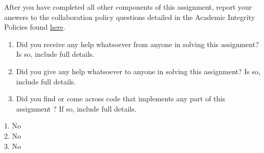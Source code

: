 \documentclass[12pt]{article}
\begin{document}
    After you have completed all other components of this assignment, report your answers to the collaboration policy questions detailed in the Academic Integrity Policies found \href{http://www.cs.cmu.edu/~mgormley/courses/10601bd-f18/about.html#7-academic-integrity-policies}{here}.
    \begin{enumerate}
        \item Did you receive any help whatsoever from anyone in solving this assignment? Is so, include full details.
        \item Did you give any help whatsoever to anyone in solving this assignment? Is so, include full details.
        \item Did you find or come across code that implements any part of this assignment ? If so, include full details.
    \end{enumerate}
    
    \begin{solution}
    1. No\\
    2. No\\
    3. No
    \end{solution}
    
\end{document}
